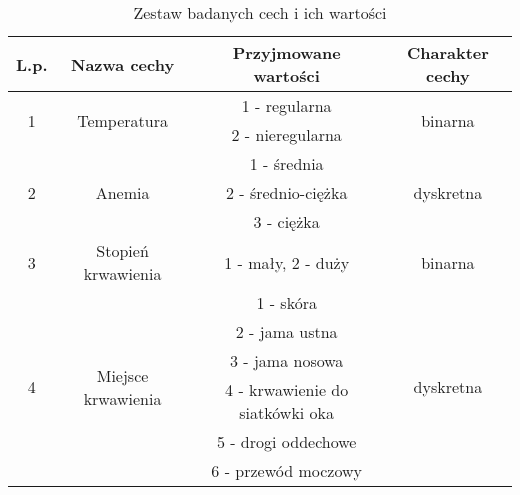 \documentclass{article}
\begin{document}
\begin{center}
	\begin{longtable}{ |c|c|c|c| } 
	\caption{Zestaw badanych cech i ich wartości}
	\label{tab:tabela_cech}\\
	\hline
L.p.                & Nazwa cechy                                         & Przyjmowane wartości                  & Charakter cechy            \\ \hline
\multirow{2}{*}{1}  & \multirow{2}{*}{Temperatura}                        & 1 - regularna                         & \multirow{2}{*}{binarna}   \\
                    &                                                     & 2 - nieregularna                      &                            \\ \hline
\multirow{3}{*}{2}  & \multirow{3}{*}{Anemia}                             & 1 - średnia                           & \multirow{3}{*}{dyskretna} \\
                    &                                                     & 2 - średnio-ciężka                    &                            \\
                    &                                                     & 3 - ciężka                            &                            \\ \hline
3                   & Stopień krwawienia                                  & 1 - mały, 2 - duży                    & binarna                    \\ \hline
\multirow{8}{*}{4}  & \multirow{8}{*}{Miejsce krwawienia}                 & 1 - skóra                             & \multirow{8}{*}{dyskretna} \\
                    &                                                     & 2 - jama ustna                        &                            \\
                    &                                                     & 3 - jama nosowa                       &                            \\
                    &                                                     & 4 - krwawienie do siatkówki oka       &                            \\
                    &                                                     & 5 - drogi oddechowe                   &                            \\
                    &                                                     & 6 - przewód moczowy                   &                            \\

\end{longtable}
\end{center}
\end{document}

